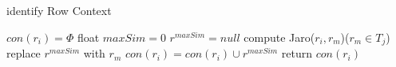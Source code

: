 \begin{algorithm}  
  \caption{identify Row Context}  
  $con(r_i)= \Phi$\;  
  {  
    float $maxSim=0$\;  
    $r^{maxSim}=null$\;  
    {  
      compute Jaro($r_i,r_m$)($r_m\in T_j$)\;  
      {  
        replace $r^{maxSim}$ with $r_m$\;  
      }  
    }  
    $con(r_i)=con(r_i)\cup {r^{maxSim}}$\;  
  }  
  return $con(r_i)$\;  
\end{algorithm}
